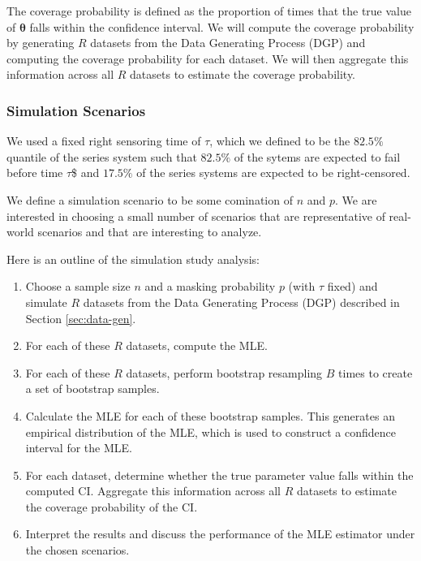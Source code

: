 \documentclass[
]{article}
\begin{document}
The coverage probability is defined as the proportion of times that the
true value of \(\boldsymbol{\theta}\) falls within the confidence
interval. We will compute the coverage probability by generating \(R\)
datasets from the Data Generating Process (DGP) and computing the
coverage probability for each dataset. We will then aggregate this
information across all \(R\) datasets to estimate the coverage
probability.

\hypertarget{simulation-scenarios}{%
\subsubsection{Simulation Scenarios}\label{simulation-scenarios}}

We used a fixed right sensoring time of \(\tau\), which we defined to be
the \(82.5\%\) quantile of the series system such that \(82.5\%\) of the
sytems are expected to fail before time \(\tau\)\$ and \(17.5\%\) of the
series systems are expected to be right-censored.

We define a simulation scenario to be some comination of \(n\) and
\(p\). We are interested in choosing a small number of scenarios that
are representative of real-world scenarios and that are interesting to
analyze.

Here is an outline of the simulation study analysis:

\begin{enumerate}
\def\labelenumi{\arabic{enumi}.}
\item
  Choose a sample size \(n\) and a masking probability \(p\) (with
  \(\tau\) fixed) and simulate \(R\) datasets from the Data Generating
  Process (DGP) described in Section \ref{sec:data-gen}.
\item
  For each of these \(R\) datasets, compute the MLE.
\item
  For each of these \(R\) datasets, perform bootstrap resampling \(B\)
  times to create a set of bootstrap samples.
\item
  Calculate the MLE for each of these bootstrap samples. This generates
  an empirical distribution of the MLE, which is used to construct a
  confidence interval for the MLE.
\item
  For each dataset, determine whether the true parameter value falls
  within the computed CI. Aggregate this information across all \(R\)
  datasets to estimate the coverage probability of the CI.
\item
  Interpret the results and discuss the performance of the MLE estimator
  under the chosen scenarios.
\end{enumerate}
\end{document}
